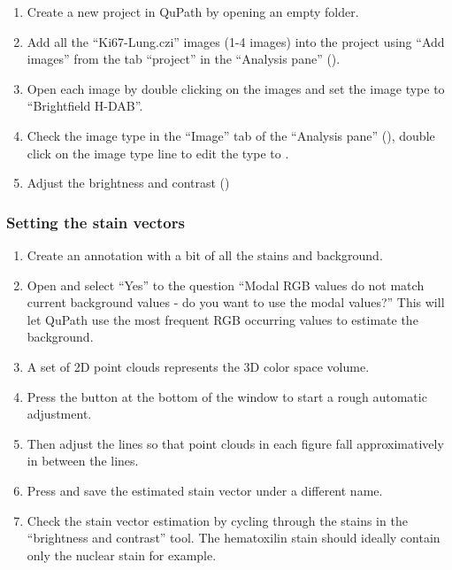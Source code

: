 \documentclass[a4paper,DIV=17,dvipsnames,headsepline]{scrartcl}
\begin{document}
\begin{enumerate}
\item Create a new project in QuPath by opening an empty folder.
\item Add all the ``Ki67-Lung.czi'' images (1-4 images) into the project using ``Add images'' from the tab ``project'' in the ``Analysis pane'' ().
\item Open each image by double clicking on the images and set the image type to ``Brightfield H-DAB''.
\item Check the image type in the ``Image'' tab of the ``Analysis pane'' (), double click on the image type line to edit the type to . 
\item  Adjust the brightness and contrast  ()
\end{enumerate}

\subsubsection{Setting the stain vectors}
\begin{enumerate}
\item Create an annotation with a bit of all the stains and background.
\item Open  and select ``Yes'' to the question ``Modal RGB values do not match current background values - do you want to use the modal values?'' This will let QuPath use the most frequent RGB occurring values to estimate the background. 
\item A set of 2D point clouds represents the 3D color space volume.
\item Press the  button at the bottom of the window to start a rough automatic adjustment.
\item Then adjust the lines so that point clouds in each figure fall approximatively in between the lines.
\item Press  and save the estimated stain vector under a different name.
\item Check the stain vector estimation by cycling through the stains in the ``brightness and contrast'' tool. The hematoxilin stain should ideally contain only the nuclear stain for example.
\end{enumerate}
\end{document}
